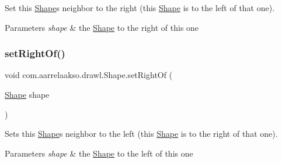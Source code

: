 Set this \hyperlink{classcom_1_1aarrelaakso_1_1drawl_1_1_shape}{Shape}\textquotesingle{}s neighbor to the right (this \hyperlink{classcom_1_1aarrelaakso_1_1drawl_1_1_shape}{Shape} is to the left of that one). 


\begin{DoxyParams}{Parameters}
{\em shape} & the \hyperlink{classcom_1_1aarrelaakso_1_1drawl_1_1_shape}{Shape} to the right of this one \\
\hline
\end{DoxyParams}
\mbox{\label{classcom_1_1aarrelaakso_1_1drawl_1_1_shape_a09e1586ce85c1d964cc3b7ce94bc5d4c}} 
\subsubsection{\texorpdfstring{set\+Right\+Of()}{setRightOf()}\hspace{0.1cm}{\footnotesize\ttfamily [1/2]}}
{\footnotesize\ttfamily void com.\+aarrelaakso.\+drawl.\+Shape.\+set\+Right\+Of (\begin{DoxyParamCaption}\item[{\hyperlink{classcom_1_1aarrelaakso_1_1drawl_1_1_shape}{Shape}}]{shape }\end{DoxyParamCaption})\hspace{0.3cm}{\ttfamily [inherited]}}



Sets this \hyperlink{classcom_1_1aarrelaakso_1_1drawl_1_1_shape}{Shape}\textquotesingle{}s neighbor to the left (this \hyperlink{classcom_1_1aarrelaakso_1_1drawl_1_1_shape}{Shape} is to the right of that one). 


\begin{DoxyParams}{Parameters}
{\em shape} & the \hyperlink{classcom_1_1aarrelaakso_1_1drawl_1_1_shape}{Shape} to the left of this one \\
\hline
\end{DoxyParams}
\mbox{\label{classcom_1_1aarrelaakso_1_1drawl_1_1_shape_a5bdc7b20e5863cf6c83a8abe57ce1399}} 
